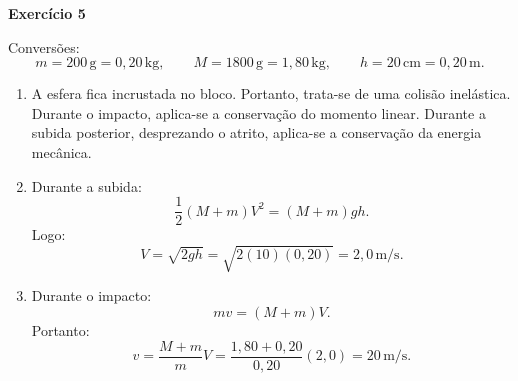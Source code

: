 \documentclass[12pt]{article}
\begin{document}
\vspace{0.2cm}

\textbf{Exercício 5}

Conversões:
\[
m=200\,\text{g}=0,20\,\text{kg},
\qquad
M=1800\,\text{g}=1,80\,\text{kg},
\qquad
h=20\,\text{cm}=0,20\,\text{m}.
\]

\begin{enumerate}[label=\textbf{\alph*)}]
    \item A esfera fica incrustada no bloco. Portanto, trata-se de uma colisão
    inelástica. Durante o impacto, aplica-se a conservação do momento linear. Durante
    a subida posterior, desprezando o atrito, aplica-se a conservação da energia
    mecânica.

    \item Durante a subida:
    \[
    \frac12(M+m)V^2=(M+m)gh.
    \]
    Logo:
    \[
    V=\sqrt{2gh}
    =\sqrt{2(10)(0,20)}
    =2,0\,\text{m/s}.
    \]

    \item Durante o impacto:
    \[
    mv=(M+m)V.
    \]
    Portanto:
    \[
    v=\frac{M+m}{m}V
    =\frac{1,80+0,20}{0,20}(2,0)
    =20\,\text{m/s}.
    \]
\end{enumerate}
\end{document}

